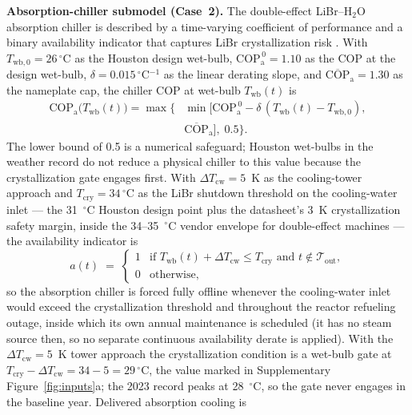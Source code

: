 \documentclass[sn-vancouver,Numbered]{sn-jnl}%
\newcommand{\runinhead}[1]{\par\smallskip\noindent\textbf{#1.}\quad}
\begin{document}
\runinhead{Absorption-chiller submodel (Case~2)}
The double-effect LiBr--H$_2$O absorption chiller is described by a time-varying coefficient of performance and a binary availability indicator that captures LiBr crystallization risk \citep{srikhirin2001absorption,herold2016absorption}. With $T_{\mathrm{wb},0}=26\,^\circ$C as the Houston design wet-bulb, $\mathrm{COP}_{\mathrm{a}}^{\,0}=1.10$ as the COP at the design wet-bulb, $\delta=0.015\,^\circ$C$^{-1}$ as the linear derating slope, and $\overline{\mathrm{COP}}_{\mathrm{a}}=1.30$ as the nameplate cap, the chiller COP at wet-bulb $T_{\mathrm{wb}}(t)$ is
\begin{equation}
\label{eq:cop_abs}
\begin{aligned}
\mathrm{COP}_{\mathrm{a}}\!\big(T_{\mathrm{wb}}(t)\big) =
\max\Big\{&
  \min\big[\mathrm{COP}_{\mathrm{a}}^{\,0}
  - \delta\,(T_{\mathrm{wb}}(t)-T_{\mathrm{wb},0}), \\
& \overline{\mathrm{COP}}_{\mathrm{a}}\big],\; 0.5\Big\}.
\end{aligned}
\end{equation}
The lower bound of 0.5 is a numerical safeguard; Houston wet-bulbs in the weather record do not reduce a physical chiller to this value because the crystallization gate engages first. With $\Delta T_{\mathrm{cw}}=5$~K as the cooling-tower approach and $T_{\mathrm{cry}}=34\,^\circ$C as the LiBr shutdown threshold on the cooling-water inlet — the 31~$^\circ$C Houston design point plus the datasheet's 3~K crystallization safety margin, inside the 34--35~$^\circ$C vendor envelope for double-effect machines — the availability indicator is
\begin{equation}
\label{eq:abs_avail}
a(t) \;=\; \begin{cases} 1 & \text{if } T_{\mathrm{wb}}(t) + \Delta T_{\mathrm{cw}} \le T_{\mathrm{cry}} \text{ and } t \notin \mathcal{T}_{\mathrm{out}}, \\ 0 & \text{otherwise}, \end{cases}
\end{equation}
so the absorption chiller is forced fully offline whenever the cooling-water inlet would exceed the crystallization threshold and throughout the reactor refueling outage, inside which its own annual maintenance is scheduled (it has no steam source then, so no separate continuous availability derate is applied). With the $\Delta T_{\mathrm{cw}}=5$~K tower approach the crystallization condition is a wet-bulb gate at $T_{\mathrm{cry}}-\Delta T_{\mathrm{cw}}=34-5=29\,^\circ$C, the value marked in Supplementary Figure~\ref{fig:inputs}a; the 2023 record peaks at 28~$^\circ$C, so the gate never engages in the baseline year. Delivered absorption cooling is
\end{document}
